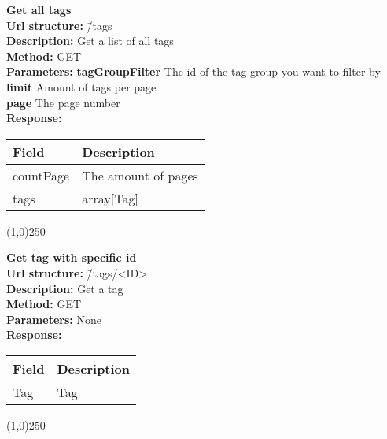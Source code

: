 \documentclass[11pt]{article}
\begin{document}
\begin{tabbing}
\textbf{Get all tags} \\
\textcolor{black!60}{\textbf{Url structure:}} \hspace{0.2in} \= /tags \\
\textcolor{black!60}{\textbf{Description:}}  \> Get a list of all tags\\
\textcolor{black!60}{\textbf{Method:}} \> GET \\
\textcolor{black!60}{\textbf{Parameters:}} \> \textbf{tagGroupFilter} The id of the tag group you want to filter by \\
\> \textbf{limit} Amount of tags per page \\
\> \textbf{page} The page number \\
\textcolor{black!60}{\textbf{Response:}} \\ \>
\begin{tabular}{|l|l|}
\hline
 Field      &  Description          \\
\hline
 countPage  &  The amount of pages  \\
 tags       &  array[Tag]           \\
\hline
\end{tabular}
\end{tabbing}

\begin{center}\line(1,0){250}\end{center}

\begin{tabbing}
\textbf{Get tag with specific id} \\
\textcolor{black!60}{\textbf{Url structure:}} \hspace{0.2in} \= /tags/<ID> \\
\textcolor{black!60}{\textbf{Description:}}  \> Get a tag \\
\textcolor{black!60}{\textbf{Method:}} \> GET \\
\textcolor{black!60}{\textbf{Parameters:}} \> None \\
\textcolor{black!60}{\textbf{Response:}} \\ \>
\begin{tabular}{|l|l|}
\hline
 Field  &  Description  \\
\hline
 Tag    &  Tag          \\
\hline
\end{tabular}
\end{tabbing}

\begin{center}\line(1,0){250}\end{center}
\end{document}

